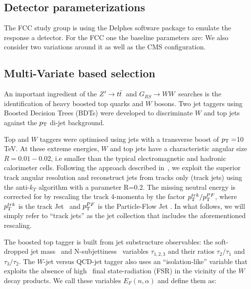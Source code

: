 \documentclass{cernrep}
\newcommand*{\zptt}{\ensuremath{Z^{\prime} \rightarrow \ttbar}}
\newcommand*{\rsg}{\ensuremath{G_{RS} \rightarrow WW}}
\begin{document}
\subsection{Detector parameterizations}
\label{subsec:detparam}

The FCC study group is using the Delphes software package to emulate the response a detector. 
For the FCC one the baseline parameters are:
We also consider two variations around it as well as the CMS configuration.


\subsection{Multi-Variate based selection}
\label{subsec:mvatagger}

An important ingredient of the \zptt\ and \rsg\ searches is the identification of heavy boosted top quarks and $W$ bosons. Two jet taggers using Boosted Decision Trees (BDTs) were developed to discriminate $W$ and top jets against the $p_{\text{T}}$ di-jet background.

Top and $W$ taggers were optimised using jets with a transverse boost of $p_{\text{T}}=$10 TeV. At these extreme energies, $W$ and top jets have a characteristic angular size $R=0.01-0.02$, i.e smaller than the typical electromagnetic and hadronic calorimeter cells. Following the approach described in~\cite{Larkoski:2015yqa}, we exploit the superior track angular resolution and reconstruct jets from tracks only (track jets) using the anti-$k_T$ algorithm with a parameter R=0.2. The missing neutral energy is corrected for by rescaling the track 4-momenta by the factor $p_{\text{T}}^{trk}/p_{\text{T}}^{PF}$, where $p_{\text{T}}^{trk}$ is the track Jet \pt\ and $p_{\text{T}}^{PF}$ is the Particle-Flow Jet \pT. In what follows, we will simply refer to ``track jets'' as the jet collection that includes the aforementioned rescaling.

The boosted top tagger is built from jet substructure observables: the soft-dropped jet mass~\cite{Larkoski:2014wba} and N-subjettiness~\cite{Thaler:2010tr} variables $\tau_{1,2,3}$ and their ratios $\tau_{2}/\tau_{1}$ and $\tau_{3}/\tau_{2}$. The $W$-jet versus QCD-jet tagger also uses an ``isolation-like'' variable that exploits the absence of high \pt\ final state-radiation (FSR) in the vicinity of the $W$ decay products. We call these variables $E_{F}(n,\alpha)$ and define them as:
\end{document}
